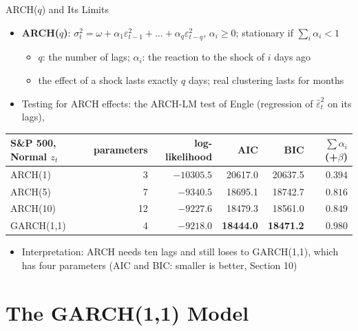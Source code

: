 \begin{frame}{ARCH($q$) and Its Limits}
\itemsize{\footnotesize}
\begin{itemize}
    \item \textbf{ARCH($q$)}: $\sigma_t^2 = \omega + \alpha_1\varepsilon_{t-1}^2 + \dots + \alpha_q\varepsilon_{t-q}^2$, $\alpha_i \ge 0$; stationary if $\sum_i \alpha_i < 1$
    \begin{itemize}
        \item $q$: the number of lags; $\alpha_i$: the reaction to the shock of $i$ days ago
        \item the effect of a shock lasts exactly $q$ days; real clustering lasts for months
    \end{itemize}
    \item Testing for ARCH effects: the ARCH-LM test of Engle (regression of $\hat\varepsilon_t^2$ on its lags), 
\end{itemize}\begin{center}
\footnotesize
\begin{tabular}{lrrrrr}
\toprule
S\&P 500, Normal $z_t$ & parameters & log-likelihood & AIC & BIC & $\sum\alpha_i$ (+$\beta$) \\
\midrule
ARCH(1) & 3 & $-10305.5$ & 20617.0 & 20637.5 & $0.394$ \\
ARCH(5) & 7 & $-9340.5$ & 18695.1 & 18742.7 & $0.816$ \\
ARCH(10) & 12 & $-9227.6$ & 18479.3 & 18561.0 & $0.849$ \\
GARCH(1,1) & 4 & $-9218.0$ & \textbf{18444.0} & \textbf{18471.2} & $0.980$ \\
\bottomrule
\end{tabular}
\end{center}
\begin{itemize}
    \item Interpretation: ARCH needs ten lags and still loses to GARCH(1,1), which has four parameters (AIC and BIC: smaller is better, Section 10)
\end{itemize}
\end{frame}


\section{The GARCH(1,1) Model}

